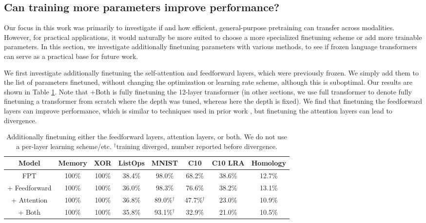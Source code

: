 \subsection{Can training more parameters improve performance?}
\label{sec:moreparams}

Our focus in this work was primarily to investigate if and how efficient, general-purpose pretraining can transfer across modalities.
However, for practical applications, it would naturally be more suited to choose a more specialized finetuning scheme or add more trainable parameters.
In this section, we investigate additionally finetuning parameters with various methods, to see if frozen language transformers can serve as a practical base for future work.

We first investigate additionally finetuning the self-attention and feedforward layers, which were previously frozen.
We simply add them to the list of parameters finetuned, without changing the optimization or learning rate scheme, although this is suboptimal.
Our results are shown in Table \ref{table:finetune_attn_ff}.
Note that +Both is fully finetuning the 12-layer transformer (in other sections, we use full transformer to denote fully finetuning a transformer from scratch where the depth was tuned, whereas here the depth is fixed).
We find that finetuning the feedforward layers can improve performance, which is similar to techniques used in prior work \citep{houlsby2019adapter}, but finetuning the attention layers can lead to divergence.

\begin{table}[H] 
\begin{center}
\begin{tabular}{c|ccccccc}
\toprule
\textbf{Model} & \multicolumn{1}{c}{\bf Memory} & \multicolumn{1}{c}{\bf XOR} & \multicolumn{1}{c}{\bf ListOps} & \multicolumn{1}{c}{\bf MNIST} & \multicolumn{1}{c}{\bf C10} & \multicolumn{1}{c}{\bf C10 LRA} & \multicolumn{1}{c}{\bf Homology} \\
\midrule
FPT           & 100\% & 100\% & 38.4\% & 98.0\% & 68.2\% & 38.6\% & 12.7\% \\
+ Feedforward & 100\% & 100\% & 36.0\% & 98.3\% & 76.6\% & 38.2\% & 13.1\% \\
+ Attention   & 100\% & 100\% & 36.8\% & 89.0\%$^\dagger$ & 47.7\%$^\dagger$ & 23.0\% & 10.9\% \\
+ Both        & 100\% & 100\% & 35.8\% & 93.1\%$^\dagger$ & 32.9\% & 21.0\% & 10.5\% \\
\bottomrule
\end{tabular}
\end{center}
\caption{
    Additionally finetuning either the feedforward layers, attention layers, or both.
    We do not use a per-layer learning scheme/etc.
    $^\dagger$training diverged, number reported before divergence.
}\label{table:finetune_attn_ff}
\end{table}

